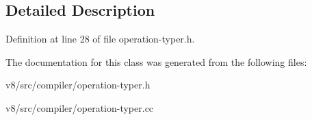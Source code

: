 \subsection{Detailed Description}


Definition at line 28 of file operation-\/typer.\+h.



The documentation for this class was generated from the following files\+:\begin{DoxyCompactItemize}
\item 
v8/src/compiler/operation-\/typer.\+h\item 
v8/src/compiler/operation-\/typer.\+cc\end{DoxyCompactItemize}
